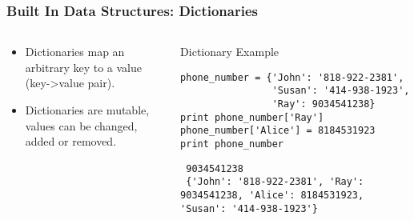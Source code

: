 \documentclass[bigger]{beamer}
\begin{document}
\begin{frame}[fragile]
\frametitle{Built In Data Structures: Dictionaries}
\label{sec-1-6}
\begin{columns}
\begin{column}{0.4\textwidth}
\label{sec-1-6-1}

\begin{itemize}
\item Dictionaries map an arbitrary key to a value (key->value pair).
\item Dictionaries are mutable, values can be changed, added or removed.
\end{itemize}
\end{column}
\begin{column}{0.6\textwidth}
\begin{block}{Dictionary Example}
\label{sec-1-6-2}

\fontsize{6}{7.2}\selectfont

\begin{verbatim}
phone_number = {'John': '818-922-2381',
                'Susan': '414-938-1923',
                'Ray': 9034541238}
print phone_number['Ray']
phone_number['Alice'] = 8184531923
print phone_number
\end{verbatim}

\begin{verbatim}
 9034541238
 {'John': '818-922-2381', 'Ray': 9034541238, 'Alice': 8184531923, 'Susan': '414-938-1923'}
\end{verbatim}
\end{block}
\end{column}
\end{columns}
\end{frame}
\end{document}
